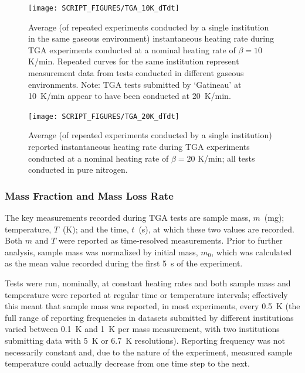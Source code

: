\documentclass{book}
\begin{document}
\begin{figure}
  \centering
  \texttt{[image: SCRIPT\_FIGURES/TGA\_10K\_dTdt]}
  \caption{Average (of repeated experiments conducted by a single institution in the same gaseous environment) instantaneous heating rate during TGA experiments conducted at a nominal heating rate of $\beta=10$ K/min. Repeated curves for the same institution represent measurement data from tests conducted in different gaseous environments. Note: TGA tests submitted by ‘Gatineau’ at 10~K/min appear to have been conducted at 20~K/min.}
  \label{Fig:TGA_10K_dTdt}
\end{figure}

\begin{figure}
  \centering
  \texttt{[image: SCRIPT\_FIGURES/TGA\_20K\_dTdt]}
  \caption{Average (of repeated experiments conducted by a single institution) reported instantaneous heating rate during TGA experiments conducted at a nominal heating rate of $\beta=20$ K/min; all tests conducted in pure nitrogen.}
  \label{Fig:TGA_20K_dTdt}
\end{figure}


\subsubsection{Mass Fraction and Mass Loss Rate}

The key measurements recorded during TGA tests are sample mass, $m$~(mg); temperature, $T$~(K); and the time, $t$~(s), at which these two values are recorded.  Both $m$ and $T$ were reported as time-resolved measurements. Prior to further analysis, sample mass was normalized by initial mass, $m_0$, which was calculated as the mean value recorded during the first 5~s of the experiment.

Tests were run, nominally, at constant heating rates and both sample mass and temperature were reported at regular time or temperature intervals; effectively this meant that sample mass was reported, in most experiments, every 0.5~K (the full range of reporting frequencies in datasets submitted by different institutions varied between 0.1~K and 1~K per mass measurement, with two institutions submitting data with 5~K or 6.7~K resolutions). Reporting frequency was not necessarily constant and, due to the nature of the experiment, measured sample temperature could actually decrease from one time step to the next.
\end{document}
